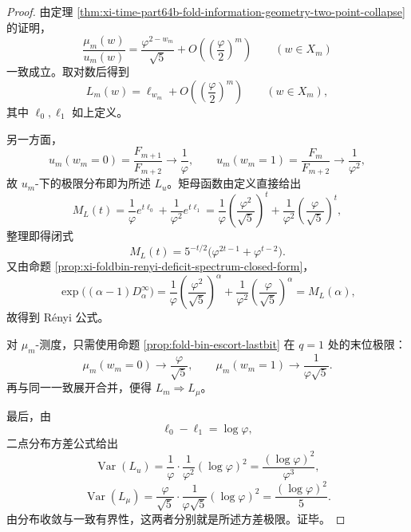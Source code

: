 \begin{proof}
由定理 \ref{thm:xi-time-part64b-fold-information-geometry-two-point-collapse} 的证明，
\[
\frac{\mu_m(w)}{u_m(w)}
=
\frac{\varphi^{2-w_m}}{\sqrt5}
+O\!\left(\left(\frac{\varphi}{2}\right)^m\right)
\qquad (w\in X_m)
\]
一致成立。取对数后得到
\[
L_m(w)=\ell_{w_m}+O\!\left(\left(\frac{\varphi}{2}\right)^m\right)
\qquad (w\in X_m),
\]
其中 \(\ell_0,\ell_1\) 如上定义。

另一方面，
\[
u_m(w_m=0)=\frac{F_{m+1}}{F_{m+2}}\longrightarrow \frac1\varphi,
\qquad
u_m(w_m=1)=\frac{F_m}{F_{m+2}}\longrightarrow \frac1{\varphi^2},
\]
故 \(u_m\)-下的极限分布即为所述 \(L_u\)。矩母函数由定义直接给出
\[
M_L(t)
=
\frac1\varphi e^{t\ell_0}+\frac1{\varphi^2}e^{t\ell_1}
=
\frac1\varphi\left(\frac{\varphi^2}{\sqrt5}\right)^t
+\frac1{\varphi^2}\left(\frac{\varphi}{\sqrt5}\right)^t,
\]
整理即得闭式
\[
M_L(t)=5^{-t/2}\bigl(\varphi^{2t-1}+\varphi^{t-2}\bigr).
\]
又由命题 \ref{prop:xi-foldbin-renyi-deficit-spectrum-closed-form}，
\[
\exp\!\bigl((\alpha-1)D_\alpha^\infty\bigr)
=
\frac1\varphi\left(\frac{\varphi^2}{\sqrt5}\right)^\alpha
+\frac1{\varphi^2}\left(\frac{\varphi}{\sqrt5}\right)^\alpha
=
M_L(\alpha),
\]
故得到 Rényi 公式。

对 \(\mu_m\)-测度，只需使用命题 \ref{prop:fold-bin-escort-lastbit} 在 \(q=1\) 处的末位极限：
\[
\mu_m(w_m=0)\longrightarrow \frac{\varphi}{\sqrt5},
\qquad
\mu_m(w_m=1)\longrightarrow \frac{1}{\varphi\sqrt5}.
\]
再与同一一致展开合并，便得 \(L_m\Rightarrow L_\mu\)。

最后，由
\[
\ell_0-\ell_1=\log\varphi,
\]
二点分布方差公式给出
\[
\operatorname{Var}(L_u)
=
\frac1\varphi\cdot\frac1{\varphi^2}(\log\varphi)^2
=
\frac{(\log\varphi)^2}{\varphi^3},
\]
\[
\operatorname{Var}(L_\mu)
=
\frac{\varphi}{\sqrt5}\cdot\frac{1}{\varphi\sqrt5}(\log\varphi)^2
=
\frac{(\log\varphi)^2}{5}.
\]
由分布收敛与一致有界性，这两者分别就是所述方差极限。证毕。
\end{proof}

